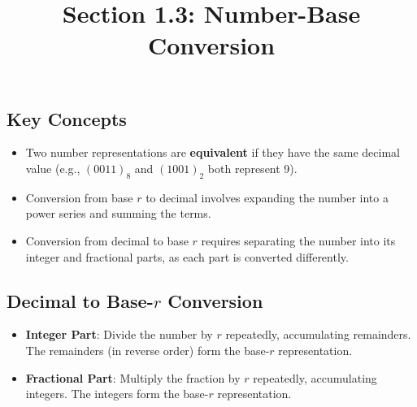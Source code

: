 \documentclass{article}
\title{Section 1.3: Number-Base Conversion}
\date{}
\begin{document}
	
	\maketitle

	\subsection*{Key Concepts}
	\begin{itemize}
		\item Two number representations are \textbf{equivalent} if they have the same decimal value (e.g., $(0011)_8$ and $(1001)_2$ both represent 9).
		\item Conversion from base $r$ to decimal involves expanding the number into a power series and summing the terms.
		\item Conversion from decimal to base $r$ requires separating the number into its integer and fractional parts, as each part is converted differently.
	\end{itemize}
	
	\subsection*{Decimal to Base-$r$ Conversion}
	\begin{itemize}
		\item \textbf{Integer Part}: Divide the number by $r$ repeatedly, accumulating remainders. The remainders (in reverse order) form the base-$r$ representation.
		\item \textbf{Fractional Part}: Multiply the fraction by $r$ repeatedly, accumulating integers. The integers form the base-$r$ representation.
	\end{itemize}
	
\end{document}

